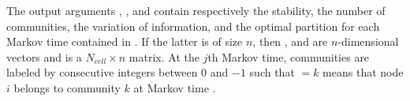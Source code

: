 The output arguments , ,  and  contain respectively the stability, the number of communities, the variation of information, and the optimal partition for each Markov time contained in . If the latter is of size $n$, then ,  and  are $n$-dimensional vectors and  is a $N_{cell} \times n$ matrix. At the $j$th Markov time, communities are labeled by consecutive integers between $0$ and $-1$ such that  $= k$ means that node $i$ belongs to community $k$ at Markov time .  
